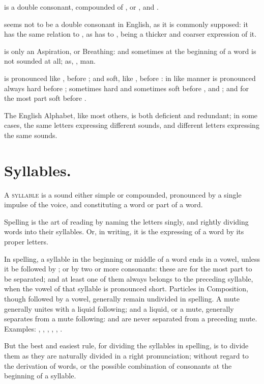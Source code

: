  is a double consonant, compounded of , or , and
.

 seems not to be a double consonant in English, as it is commonly
supposed: it has the same relation to , as  has to ,
being a thicker and coarser expression of it.

 is only an Aspiration, or Breathing: and sometimes at the
beginning of a word is not sounded at all; as, ,  man.

 is pronounced like , before ; and soft, like
, before : in like manner  is pronounced always
hard before ; sometimes hard and sometimes soft before
, and ; and for the most part soft before .

The English Alphabet, like most others, is both deficient and redundant;
in some cases, the same letters expressing different sounds, and
different letters expressing the same sounds.

\section{Syllables.}

\textsc{A syllable} is a sound either simple or compounded, pronounced
by a single impulse of the voice, and constituting a word or part of a
word.

Spelling is the art of reading by naming the letters singly, and rightly
dividing words into their syllables. Or, in writing, it is the
expressing of a word by its proper letters.

In spelling, a syllable in the beginning or middle of a word ends in a
vowel, unless it be followed by ; or by two or more consonants:
these are for the most part to be separated; and at least one of them
always belongs to the preceding syllable, when the vowel of that
syllable is pronounced short. Particles in Composition, though followed
by a vowel, generally remain undivided in spelling. A mute generally
unites with a liquid following; and a liquid, or a mute, generally
separates from a mute following:  and  are never separated
from a preceding mute. Examples: , ,
, , ,
.

But the best and easiest rule, for dividing the syllables in spelling,
is to divide them as they are naturally divided in a right
pronunciation; without regard to the derivation of words, or the
possible combination of consonants at the beginning of a syllable.

